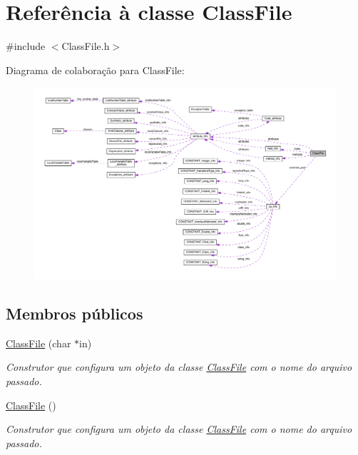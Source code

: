 \hypertarget{classClassFile}{}\section{Referência à classe Class\+File}
\label{classClassFile}


{\ttfamily \#include $<$Class\+File.\+h$>$}



Diagrama de colaboração para Class\+File\+:
\nopagebreak
\begin{figure}[H]
\begin{center}
\leavevmode
\includegraphics[width=350pt]{classClassFile__coll__graph}
\end{center}
\end{figure}
\subsection*{Membros públicos}
\begin{DoxyCompactItemize}
\item 
\hyperlink{classClassFile_a7cf76bcaf785b984e9d1b31d52a5aa7f}{Class\+File} (char $\ast$in)
\begin{DoxyCompactList}\small\item\em Construtor que configura um objeto da classe \hyperlink{classClassFile}{Class\+File} com o nome do arquivo passado. \end{DoxyCompactList}\item 
\hyperlink{classClassFile_a47669d90346c9fa0db30ae582c74a199}{Class\+File} ()
\begin{DoxyCompactList}\small\item\em Construtor que configura um objeto da classe \hyperlink{classClassFile}{Class\+File} com o nome do arquivo passado. \end{DoxyCompactList}\end{DoxyCompactItemize}
